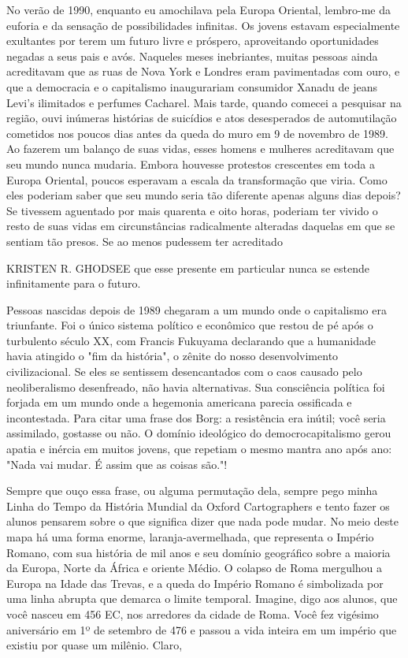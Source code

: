 No verão de 1990, enquanto eu amochilava pela Europa Oriental, lembro-me da euforia e da sensação de possibilidades infinitas. Os jovens estavam especialmente exultantes por terem um futuro livre e próspero, aproveitando oportunidades negadas a seus pais e avós. Naqueles meses inebriantes, muitas pessoas ainda acreditavam que as ruas de Nova York e Londres eram pavimentadas com ouro, e que a democracia e o capitalismo inaugurariam consumidor Xanadu de jeans Levi's ilimitados e perfumes Cacharel. Mais tarde, quando comecei a pesquisar na região, ouvi inúmeras histórias de suicídios e atos desesperados de automutilação cometidos nos poucos dias antes da queda do muro em {\color{blue}9} de novembro de 1989. Ao fazerem um balanço de suas vidas, esses homens e mulheres acreditavam que seu mundo nunca mudaria. Embora houvesse protestos crescentes em toda a Europa Oriental, poucos esperavam a escala da transformação que viria. Como eles poderiam saber que seu mundo seria tão diferente apenas alguns dias depois? Se tivessem aguentado por mais quarenta e oito horas, poderiam ter vivido o resto de suas vidas em circunstâncias radicalmente alteradas daquelas em que se sentiam tão presos. Se ao menos pudessem ter acreditado
 \par 
KRISTEN R. GHODSEE que esse presente em particular nunca se estende infinitamente para o futuro.
 \par 
Pessoas nascidas depois de 1989 chegaram a um mundo onde o capitalismo era triunfante. Foi o único sistema político e econômico que restou de pé após o turbulento século XX, com Francis Fukuyama declarando que a humanidade havia atingido o "fim da história", o zênite do nosso desenvolvimento civilizacional. Se eles se sentissem desencantados com o caos causado pelo neoliberalismo desenfreado, não havia alternativas. Sua consciência política foi forjada em um mundo onde a hegemonia americana parecia ossificada e incontestada. Para citar uma frase dos Borg: a resistência era inútil; você seria assimilado, gostasse ou não. O domínio ideológico do democrocapitalismo gerou apatia e inércia em muitos jovens, que repetiam o mesmo mantra ano após ano: "Nada vai mudar. É assim que as coisas são."!
 \par 
Sempre que ouço essa frase, ou alguma permutação dela, sempre pego minha Linha do Tempo da História Mundial da Oxford Cartographers e tento fazer os alunos pensarem sobre o que significa dizer que nada pode mudar. No meio deste mapa há uma forma enorme, laranja-avermelhada, que representa o Império Romano, com sua história de mil anos e seu domínio geográfico sobre a maioria da Europa, Norte da África e oriente Médio. O colapso de Roma mergulhou a Europa na Idade das Trevas, e a queda do Império Romano é simbolizada por uma linha abrupta que demarca o limite temporal. Imagine, digo aos alunos, que você nasceu em {\color{blue}456} EC, nos arredores da cidade de Roma. Você fez vigésimo aniversário em 1º de setembro de {\color{blue}476} e passou a vida inteira em um império que existiu por quase um milênio. Claro,
